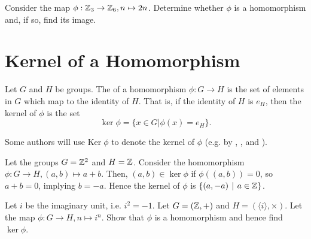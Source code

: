\begin{exercise}
    Consider the map $\phi: \mathbb{Z}_3 \to \mathbb{Z}_6, n \mapsto 2n$. Determine whether $\phi$ is a homomorphism and, if so, find its image.
\end{exercise}

\section{Kernel of a Homomorphism}
\begin{definition}
    Let $G$ and $H$ be groups. The  of a homomorphism $\phi: G \to H$ is the set of elements in $G$ which map to the identity of $H$. That is, if the identity of $H$ is $e_H$, then the kernel of $\phi$ is the set
    \[
        \ker\phi = \{x \in G \vert \phi(x) = e_H\}.
    \]
\end{definition}

\begin{remark}
    Some authors will use $\mathrm{Ker}\;\phi$ to denote the kernel of $\phi$ (e.g. by \cite[Definition I.2.2]{hungerford_1980}, \cite[\S 65]{clark_1984}, and \cite[p.~194]{gallian_2016}).
\end{remark}

\begin{example}
    Let the groups $G = \mathbb{Z}^2$ and $H = \mathbb{Z}$. Consider the homomorphism $\phi: G \to H, (a, b) \mapsto a+b$. Then, $(a, b) \in \ker\phi$ if $\phi((a,b)) = 0$, so $a+b = 0$, implying $ b = -a$. Hence the kernel of $\phi$ is $\{(a, -a) \vert a \in \Z\}$.
\end{example}

\begin{exercise}
    Let $i$ be the imaginary unit, i.e. $i^2 = -1$. Let $G = (\mathbb{Z}, +)$ and $H = (\langle i \rangle, \times)$. Let the map $\phi: G \to H, n \mapsto i^n$.  Show that $\phi$ is a homomorphism and hence find $\ker\phi$.
\end{exercise}

